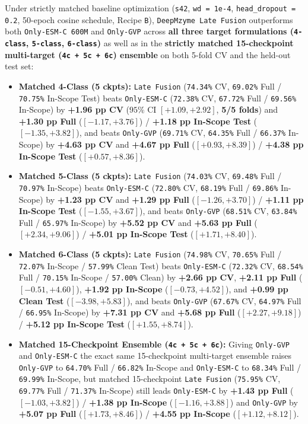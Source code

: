 \documentclass[10pt,a4paper,twocolumn]{article}
\begin{document}
Under strictly matched baseline optimization (\texttt{s42}, \texttt{wd = 1e-4}, \texttt{head\_dropout = 0.2}, 50-epoch cosine schedule, Recipe \texttt{B}), \texttt{DeepMzyme Late Fusion} outperforms both \texttt{Only-ESM-C 600M} and \texttt{Only-GVP} across \textbf{all three target formulations (\texttt{4-class}, \texttt{5-class}, \texttt{6-class})} as well as in the \textbf{strictly matched 15-checkpoint multi-target (\texttt{4c + 5c + 6c}) ensemble} on both 5-fold CV and the held-out test set:
\begin{itemize}
  \item \textbf{Matched 4-Class (5 ckpts):} \texttt{Late Fusion} (\texttt{74.34\%} CV, \texttt{69.02\%} Full / \texttt{70.75\%} In-Scope Test) beats \texttt{Only-ESM-C} (\texttt{72.38\%} CV, \texttt{67.72\%} Full / \texttt{69.56\%} In-Scope) by \textbf{+1.96 pp CV} ($95\%$ CI $[+1.09, +2.92]$, \textbf{5/5 folds}) and \textbf{+1.30 pp Full} ($[-1.17, +3.76]$) / \textbf{+1.18 pp In-Scope Test} ($[-1.35, +3.82]$), and beats \texttt{Only-GVP} (\texttt{69.71\%} CV, \texttt{64.35\%} Full / \texttt{66.37\%} In-Scope) by \textbf{+4.63 pp CV} and \textbf{+4.67 pp Full} ($[+0.93, +8.39]$) / \textbf{+4.38 pp In-Scope Test} ($[+0.57, +8.36]$).
  \item \textbf{Matched 5-Class (5 ckpts):} \texttt{Late Fusion} (\texttt{74.03\%} CV, \texttt{69.48\%} Full / \texttt{70.97\%} In-Scope) beats \texttt{Only-ESM-C} (\texttt{72.80\%} CV, \texttt{68.19\%} Full / \texttt{69.86\%} In-Scope) by \textbf{+1.23 pp CV} and \textbf{+1.29 pp Full} ($[-1.26, +3.70]$) / \textbf{+1.11 pp In-Scope Test} ($[-1.55, +3.67]$), and beats \texttt{Only-GVP} (\texttt{68.51\%} CV, \texttt{63.84\%} Full / \texttt{65.97\%} In-Scope) by \textbf{+5.52 pp CV} and \textbf{+5.63 pp Full} ($[+2.34, +9.06]$) / \textbf{+5.01 pp In-Scope Test} ($[+1.71, +8.40]$).
  \item \textbf{Matched 6-Class (5 ckpts):} \texttt{Late Fusion} (\texttt{74.98\%} CV, \texttt{70.65\%} Full / \texttt{72.07\%} In-Scope / \texttt{57.99\%} Clean Test) beats \texttt{Only-ESM-C} (\texttt{72.32\%} CV, \texttt{68.54\%} Full / \texttt{70.15\%} In-Scope / \texttt{57.00\%} Clean) by \textbf{+2.66 pp CV}, \textbf{+2.11 pp Full} ($[-0.51, +4.60]$), \textbf{+1.92 pp In-Scope} ($[-0.73, +4.52]$), and \textbf{+0.99 pp Clean Test} ($[-3.98, +5.83]$), and beats \texttt{Only-GVP} (\texttt{67.67\%} CV, \texttt{64.97\%} Full / \texttt{66.95\%} In-Scope) by \textbf{+7.31 pp CV} and \textbf{+5.68 pp Full} ($[+2.27, +9.18]$) / \textbf{+5.12 pp In-Scope Test} ($[+1.55, +8.74]$).
  \item \textbf{Matched 15-Checkpoint Ensemble (\texttt{4c + 5c + 6c}):} Giving \texttt{Only-GVP} and \texttt{Only-ESM-C} the exact same 15-checkpoint multi-target ensemble raises \texttt{Only-GVP} to \texttt{64.70\%} Full / \texttt{66.82\%} In-Scope and \texttt{Only-ESM-C} to \texttt{68.34\%} Full / \texttt{69.99\%} In-Scope, but matched 15-checkpoint \texttt{Late Fusion} (\texttt{75.95\%} CV, \texttt{69.77\%} Full / \texttt{71.37\%} In-Scope) still leads \texttt{Only-ESM-C} by \textbf{+1.43 pp Full} ($[-1.03, +3.82]$) / \textbf{+1.38 pp In-Scope} ($[-1.16, +3.88]$) and \texttt{Only-GVP} by \textbf{+5.07 pp Full} ($[+1.73, +8.46]$) / \textbf{+4.55 pp In-Scope} ($[+1.12, +8.12]$).

\end{itemize}
\end{document}

